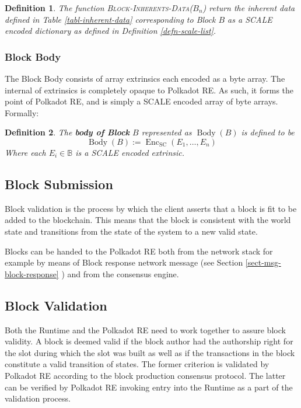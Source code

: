 \documentclass{book}
\newcommand{\assign}{:=}
\newcommand{\tmname}[1]{\textsc{#1}}
\newcommand{\tmop}[1]{\ensuremath{\operatorname{#1}}}
\newcommand{\tmstrong}[1]{\textbf{#1}}
\newcommand{\tmtextbf}[1]{{\bfseries{#1}}}
\newcommand{\tmtextsc}[1]{{\scshape{#1}}}
\newcommand{\tmtexttt}[1]{{\ttfamily{#1}}}
\newcommand{\tmverbatim}[1]{{\ttfamily{#1}}}
\newtheorem{definition}{Definition}
\providecommand{\tmname}[1]{\tmtextsc{#1}}
\providecommand{\tmop}[1]{\ensuremath{\mathrm{#1}}}
\providecommand{\tmstrong}[1]{\tmtextbf{#1}}
\providecommand{\tmtextbf}[1]{\tmtextbf{#1}}
\providecommand{\tmverbatim}[1]{\tmtexttt{#1}}
\newtheorem{definition}{Definition}
\begin{document}
\begin{definition}
  \label{defn-func-inherent-data}The function
  {\tmname{Block-Inherents-Data($B_n$)}} return the inherent data defined in
  Table \ref{tabl-inherent-data} corresponding to Block $B$ as a SCALE encoded
  dictionary as defined in Definition \ref{defn-scale-list}.
\end{definition}

\subsubsection{Block Body}\label{sect-block-body}

The Block Body consists of array extrinsics each encoded as a byte array. The
internal of extrinsics is completely opaque to Polkadot RE. As such, it forms
the point of Polkadot RE, and is simply a SCALE encoded array of byte arrays.
Formally:

\begin{definition}
  \label{defn-block-body}The {\tmstrong{body of Block}} $B$ represented as
  {\tmstrong{$\tmop{Body} (B)$}} is defined to be
  \[ \tmop{Body} (B) \assign \tmop{Enc}_{\tmop{SC}} (E_1, \ldots, E_n) \]
  Where each $E_i \in \mathbb{B}$ is a SCALE encoded extrinsic.
\end{definition}

\subsection{Block Submission}\label{sect-block-submission}

Block validation is the process by which the client asserts that a block is
fit to be added to the blockchain. This means that the block is consistent
with the world state and transitions from the state of the system to a new
valid state.

Blocks can be handed to the Polkadot RE both from the network stack for
example by means of Block response network message (see Section
\ref{sect-msg-block-response} ) and from the consensus engine.

\subsection{Block Validation}\label{sect-block-validation}

Both the Runtime and the Polkadot RE need to work together to assure block
validity. A block is deemed valid if the block author had the authorship right
for the slot during which the slot was built as well as if the transactions in
the block constitute a valid transition of states. The former criterion is
validated by Polkadot RE according to the block production consensus protocol.
The latter can be verified by Polkadot RE invoking \tmverbatim{execute\_block}
entry into the Runtime as a part of the validation process.
\end{document}

